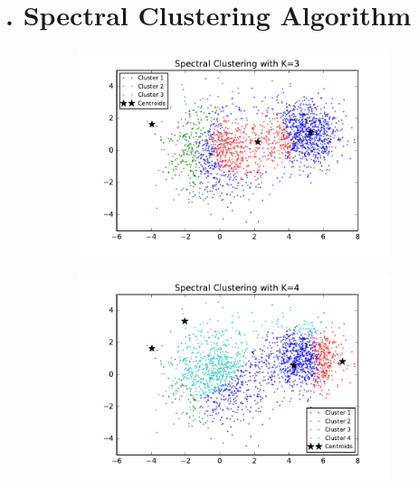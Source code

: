 \section*{\Large {}. Spectral Clustering Algorithm}

\begin{figure}[htb]
        \centering
        \begin{subfigure}[b]{0.475\textwidth}
            \centering
            \includegraphics[width=\textwidth]{./figures/clustering_spectral_3.pdf}
        \end{subfigure}
        \hfill
        \begin{subfigure}[b]{0.475\textwidth}  
            \centering 
            \includegraphics[width=\textwidth]{./figures/clustering_spectral_4.pdf}

\end{subfigure}
\end{figure}

